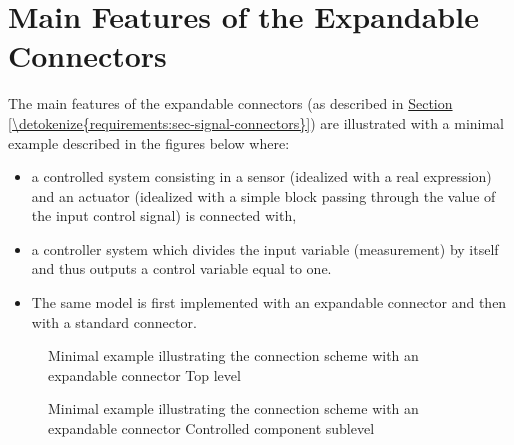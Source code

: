 \documentclass[letterpaper,10pt, openany,english]{sphinxmanual}
\begin{document}
\section{Main Features of the Expandable Connectors}
\label{\detokenize{annex:main-features-of-the-expandable-connectors}}\label{\detokenize{annex:sec-annex-bus-example}}
The main features of the expandable connectors (as described in \hyperref[\detokenize{requirements:sec-signal-connectors}]{Section \ref{\detokenize{requirements:sec-signal-connectors}}}) are illustrated with a minimal example described in the figures below where:
\begin{itemize}
\item {} 
a controlled system consisting in a sensor (idealized with a real expression) and an actuator (idealized with a simple block passing through the value of the input control signal) is connected with,

\item {} 
a controller system which divides the input variable (measurement) by itself and thus outputs a control variable equal to one.

\item {} 
The same model is first implemented with an expandable connector and then with a standard connector.

\end{itemize}

\begin{figure}[htbp]
\centering
\capstart

\noindent{}
\caption{Minimal example illustrating the connection scheme with an expandable connector \textendash{} Top level}\label{\detokenize{annex:bustestexp}}\end{figure}

\begin{sphinxVerbatim}[commandchars=\\\{\}]
 
 
 
       
 
\end{sphinxVerbatim}

\begin{figure}[htbp]
\centering
\capstart

\noindent{}
\caption{Minimal example illustrating the connection scheme with an expandable connector \textendash{} Controlled component sublevel}\label{\detokenize{annex:bustestcontrolledexp}}\end{figure}
\end{document}
